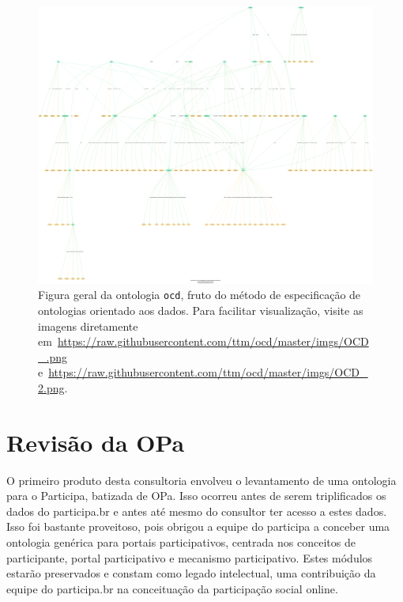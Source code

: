 \documentclass[12pt]{article}
\begin{document}
\begin{figure}[h!]
  \centering
    \includegraphics[width=\textwidth]{../figs/OCD_2.png}
  \caption{Figura geral da ontologia \texttt{ocd}, fruto do método de especificação de ontologias orientado aos dados. Para facilitar visualização, visite as imagens diretamente em~\url{https://raw.githubusercontent.com/ttm/ocd/master/imgs/OCD_.png} e~\url{https://raw.githubusercontent.com/ttm/ocd/master/imgs/OCD_2.png}.}\label{fig:ocdg}
\end{figure}


\section{Revisão da OPa}\label{ap:opa}
O primeiro produto desta consultoria envolveu o levantamento de uma ontologia para o Participa, batizada de OPa. Isso ocorreu antes de serem triplificados os dados do participa.br e antes até mesmo do consultor ter acesso a estes dados. Isso foi bastante proveitoso, pois obrigou a equipe do participa a conceber uma ontologia genérica para portais participativos, centrada nos conceitos de participante, portal participativo e mecanismo participativo. Estes módulos estarão preservados e constam como legado intelectual, uma contribuição da equipe do participa.br na conceituação da participação social online.
\end{document}
